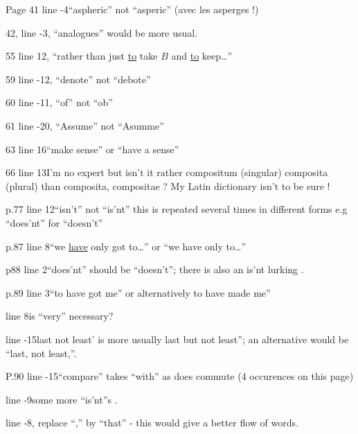 Page 41 \unsure{-}line -4\quad ``aspheric'' not ``asperic'' (avec\unsure{,|-} les asperges !)

42, line -3, ``analogues'' would be more usual.

55 line 12, ``rather than just \uline{to} take $B$ and \uline{to} keep\ldots''

59 line -12, ``denote'' not ``debote''

60 line -11, ``of'' not ``ob''

61 line -20, ``Assume'' not ``Asumme''

63 line 16\quad ``make sense'' or ``have a sense''

66 line 13\quad I'm no  expert but isn't it rather compositum (singular) composita (plural) than composita, compositae ? My Latin dictionary isn't  to be sure !

p.77 line 12\quad ``isn't'' not ``is'nt'' this is repeated several times in different forms e.g ``does'nt'' for ``doesn't''

p.87 line 8\quad ``we \uline{have} only got to\ldots'' or ``we have only to\ldots''

p88 line 2\quad ``does'nt'' should be ``doesn't''; there is also an is'nt lurking .

p.89 line 3\quad ``to have got me'' or alternatively to have made me''

line 8\quad is ``very'' necessary?

line -15\quad {}last not least’ is more usually last but not least''; an alternative would be ``last, not least,''.

P.90 line -15\quad ``compare'' takes ``with'' as does commute (4 occurences on this page)

line -9\quad some more ``is'nt''s .

line -8, replace ``,'' by ``that'' - this would give a better flow of words.

